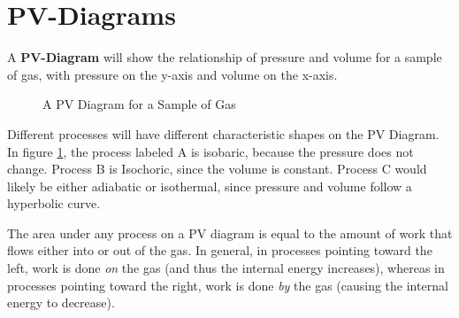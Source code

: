 	\newpage
	
	\section{PV-Diagrams} 
	A \textbf{PV-Diagram} will show the relationship of pressure and volume for a sample of gas, with pressure on the y-axis and volume on the x-axis.  

\begin{figure}[h]
		\caption{A PV Diagram for a Sample of Gas} \label{figure:pv1}
	\centering

\end{figure}
	
Different processes will have different characteristic shapes on the PV Diagram.  In figure \ref{figure:pv1}, the process labeled A is isobaric, because the pressure does not change.  Process B is Isochoric, since the volume is constant.  Process C would likely be either adiabatic or isothermal, since pressure and volume follow a hyperbolic curve.


The area under any process on a PV diagram is equal to the amount of work that flows either into or out of the gas.  In general, in processes pointing toward the left, work is done \textit{on} the gas (and thus the internal energy increases), whereas in processes pointing toward the right, work is done \textit{by} the gas (causing the internal energy to decrease). 


